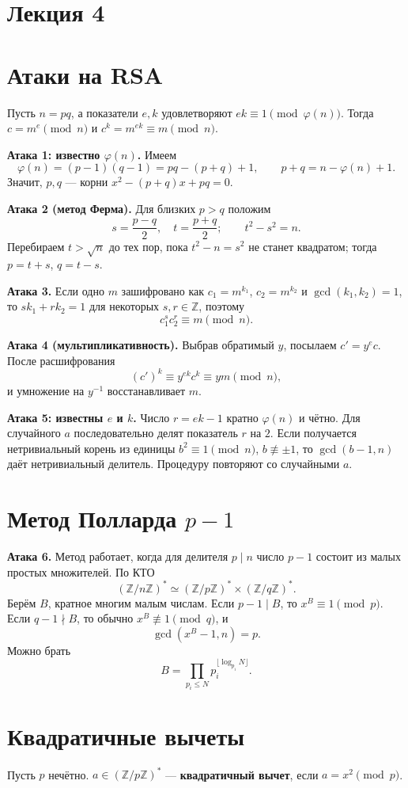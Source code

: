 \documentclass[12pt,a4paper]{article}
\newcommand{\Z}{\mathbb Z}\newcommand{\F}{\mathbb F}\DeclareMathOperator{\ord}{ord}
\begin{document}
\section*{\centering Лекция 4}
\section{Атаки на RSA}
Пусть $n=pq$, а показатели $e,k$ удовлетворяют $ek\equiv1\pmod{\varphi(n)}$. Тогда $c=m^e\pmod n$ и $c^k=m^{ek}\equiv m\pmod n$.

\textbf{Атака 1: известно $\varphi(n)$.} Имеем
\[\varphi(n)=(p-1)(q-1)=pq-(p+q)+1,\qquad p+q=n-\varphi(n)+1.\]
Значит, $p,q$ --- корни $x^2-(p+q)x+pq=0$.

\textbf{Атака 2 (метод Ферма).} Для близких $p>q$ положим
\[s=\frac{p-q}{2},\quad t=\frac{p+q}{2};\qquad t^2-s^2=n.\]
Перебираем $t>\sqrt n$ до тех пор, пока $t^2-n=s^2$ не станет квадратом; тогда $p=t+s$, $q=t-s$.

\textbf{Атака 3.} Если одно $m$ зашифровано как $c_1=m^{k_1}$, $c_2=m^{k_2}$ и $\gcd(k_1,k_2)=1$, то $sk_1+rk_2=1$ для некоторых $s,r\in\Z$, поэтому
\[c_1^s c_2^r\equiv m\pmod n.\]

\textbf{Атака 4 (мультипликативность).} Выбрав обратимый $y$, посылаем $c'=y^e c$. После расшифрования
\[(c')^k\equiv y^{ek}c^k\equiv ym\pmod n,\]
и умножение на $y^{-1}$ восстанавливает $m$.

\textbf{Атака 5: известны $e$ и $k$.} Число $r=ek-1$ кратно $\varphi(n)$ и чётно. Для случайного $a$ последовательно делят показатель $r$ на $2$. Если получается нетривиальный корень из единицы $b^2\equiv1\pmod n$, $b\not\equiv\pm1$, то $\gcd(b-1,n)$ даёт нетривиальный делитель. Процедуру повторяют со случайными $a$.

\section{Метод Полларда $p-1$}
\textbf{Атака 6.} Метод работает, когда для делителя $p\mid n$ число $p-1$ состоит из малых простых множителей. По КТО
\[(\Z/n\Z)^*\simeq(\Z/p\Z)^*\times(\Z/q\Z)^*.\]
Берём $B$, кратное многим малым числам. Если $p-1\mid B$, то $x^B\equiv1\pmod p$. Если $q-1\nmid B$, то обычно $x^B\not\equiv1\pmod q$, и
\[\gcd(x^B-1,n)=p.\]
Можно брать
\[B=\prod_{p_i\le N}p_i^{\lfloor\log_{p_i}N\rfloor}.\]

\section{Квадратичные вычеты}
Пусть $p$ нечётно. $a\in(\Z/p\Z)^*$ --- \textbf{квадратичный вычет}, если $a=x^2\pmod p$.
\end{document}
